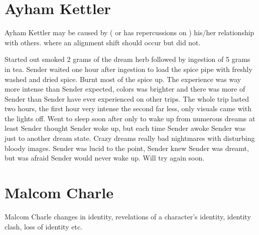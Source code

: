 \documentclass[12pt]{book}
\begin{document}
\chapter{Ayham Kettler}

Ayham Kettler may be caused by ( or has repercussions on ) his/her relationship with others. where an alignment shift should occur but did not.



Started out smoked 2 grams of the dream herb followed by ingestion of 5 grams in tea. Sender waited one hour after ingestion to load the spice pipe with freshly washed and dried spice. Burnt most of the spice up. The experience was way more intense than Sender expected, colors was brighter and there was more of Sender than Sender have ever experienced on other trips. The whole trip lasted two hours, the first hour very intense the second far less, only visuals came with the lights off. Went to sleep soon after only to wake up from numerous dreams at least Sender thought Sender woke up, but each time Sender awoke Sender was just to another dream state. Crazy dreams really bad nightmares with disturbing bloody images. Sender was lucid to the point, Sender knew Sender was dreamt, but was afraid Sender would never wake up. Will try again soon.



\chapter{Malcom Charle}

Malcom Charle changes in identity, revelations of a character's identity, identity clash, loss of identity etc.
\end{document}
